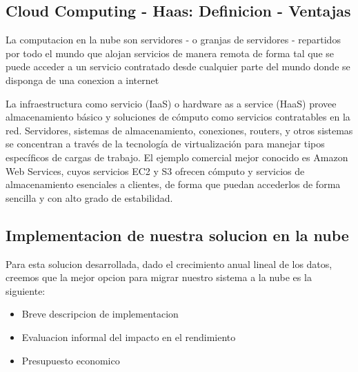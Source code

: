 \documentclass{article}
\begin{document}
\subsection{Cloud Computing - Haas: Definicion - Ventajas}
La computacion en la nube son servidores - o granjas de servidores - repartidos por todo el mundo que alojan servicios de manera remota de forma tal que se puede acceder a un servicio contratado desde cualquier parte del mundo donde se disponga de una conexion a internet

La infraestructura como servicio (IaaS) o hardware as a service (HaaS) provee almacenamiento b\'asico y soluciones de c\'omputo como servicios contratables en la red.
Servidores, sistemas de almacenamiento, conexiones, routers, y otros sistemas se concentran a trav\'es de la tecnolog\'ia de virtualizaci\'on para manejar tipos espec\'ificos de cargas de trabajo. El ejemplo comercial mejor conocido es Amazon Web Services, cuyos servicios EC2 y S3 ofrecen c\'omputo y servicios de almacenamiento esenciales a clientes, de forma que puedan accederlos de forma sencilla y con alto grado de estabilidad. 

\subsection{Implementacion de nuestra solucion en la nube}

Para esta solucion desarrollada, dado el crecimiento anual lineal de los datos, creemos que la mejor opcion para migrar nuestro sistema a la nube es la siguiente:

\begin{itemize}
  \item Breve descripcion de implementacion
  \item Evaluacion informal del impacto en el rendimiento
  \item Presupuesto economico
\end{itemize}
\end{document}
